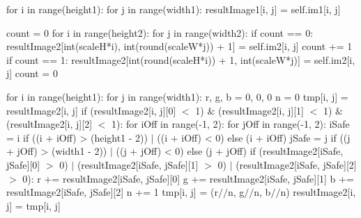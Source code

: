 \documentclass[final,a4paper,openany,12pt]{mwbk}
\begin{document}
for i in range(height1): \newline
\indent for j in range(width1): \newline
\indent resultImage1[i, j] = self.im1[i, j] \newline

count = 0 \newline
\indent for i in range(height2): \newline
\indent for j in range(width2): \newline
\indent if count == 0: \newline
\indent resultImage2[int(scaleH*i), int(round(scaleW*j)) + 1] = self.im2[i, j] \newline
\indent count += 1 \newline
\indent if count == 1: \newline
\indent resultImage2[int(round(scaleH*i)) + 1, int(scaleW*j)] = self.im2[i, j] \newline
\indent count = 0 \newline

for i in range(height1): \newline
\indent for j in range(width1): \newline
\indent r, g, b = 0, 0, 0 \newline
\indent n = 0 \newline
\indent tmp[i, j] = resultImage2[i, j] \newline
\indent if (resultImage2[i, j][0] $<$ 1) $\&$ (resultImage2[i, j][1] $<$ 1) $\&$ (resultImage2[i, j][2] $<$ 1): \newline
\indent for iOff in range(-1, 2): \newline
\indent for jOff in range(-1, 2): \newline
\indent iSafe = i if ((i + iOff) > (height1 - 2)) $\mid$ ((i + iOff) < 0) else (i + iOff) \newline
\indent jSafe = j if ((j + jOff) > (width1 - 2)) $\mid$ ((j + jOff) < 0) else (j + jOff) \newline
\indent if (resultImage2[iSafe, jSafe][0] $>$ 0) $\mid$ (resultImage2[iSafe, jSafe][1] $>$ 0) $\mid$ (resultImage2[iSafe, jSafe][2] $>$ 0): \newline
\indent r += resultImage2[iSafe, jSafe][0] \newline
\indent \indent g += resultImage2[iSafe, jSafe][1] \newline
\indent \indent b += resultImage2[iSafe, jSafe][2] \newline
\indent \indent n += 1 \newline
\indent \indent tmp[i, j] = (r$//$n, g$//$n, b$//$n) \newline
\indent \indent resultImage2[i, j] = tmp[i, j] \newline
\end{document}
